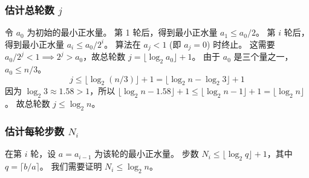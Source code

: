 \documentclass{ctexart}
\begin{document}
\subsubsection{估计总轮数 $j$}
令 $a_0$ 为初始的最小正水量。
第 1 轮后，得到最小正水量 $a_1 \le a_0/2$。
第 $i$ 轮后，得到最小正水量 $a_i \le a_0/2^i$。
算法在 $a_j < 1$ (即 $a_j=0$) 时终止。
这需要 $a_0/2^j < 1 \implies 2^j > a_0$，故总轮数 $j = \lfloor \log_2 a_0 \rfloor + 1$。
由于 $a_0$ 是三个量之一， $a_0 \le n/3$。
$$ j \le \lfloor \log_2(n/3) \rfloor + 1 = \lfloor \log_2 n - \log_2 3 \rfloor + 1 $$
因为 $\log_2 3 \approx 1.58 > 1$，所以 $\lfloor \log_2 n - 1.58 \rfloor + 1 \le \lfloor \log_2 n - 1 \rfloor + 1 = \lfloor \log_2 n \rfloor$。
故总轮数 $j \le \log_2 n$。

\subsubsection{估计每轮步数 $N_i$}
在第 $i$ 轮，设 $a = a_{i-1}$ 为该轮的最小正水量。
步数 $N_i \le \lfloor \log_2 q \rfloor + 1$，其中 $q = \lceil b/a \rceil$。
我们需要证明 $N_i \le \log_2 n$。
\end{document}

